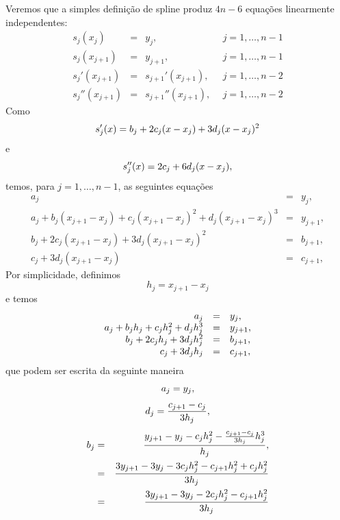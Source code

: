 \documentclass[main.tex]{subfiles}
\begin{document}
Veremos que a simples definição de spline produz $4n-6$ equações linearmente independentes:
\begin{equation*}
\begin{array}{rcll}
s_j(x_j)&=&y_j,~~ &j=1,\ldots, n-1\\
s_{j}(x_{j+1})&=&y_{j+1},~~ &j=1,\ldots, n-1\\
s_{j}'(x_{j+1})&=&s_{j+1}'(x_{j+1}),~~ &j=1,\ldots, n-2\\
s_{j}''(x_{j+1})&=&s_{j+1}''(x_{j+1}),~~ &j=1,\ldots, n-2
\end{array}
\end{equation*}
Como
\begin{equation}{\label{eq_1derivada}}
s'_j(x)=b_j+2c_j(x-x_j)+3d_j(x-x_j)^2
\end{equation}
e
\begin{equation}{\label{eq_2derivada}}
s''_j(x)=2c_j+6d_j(x-x_j),
\end{equation}
temos, para $j=1,\ldots, n-1$, as seguintes equações
\begin{equation*}
\begin{array}{rcl}
a_j&=&y_j,\\
a_j+b_j(x_{j+1}-x_j)+c_j(x_{j+1}-x_j)^2+d_j(x_{j+1}-x_j)^3&=&y_{j+1},\\
b_j+2c_j(x_{j+1}-x_j)+3d_j(x_{j+1}-x_j)^2&=&b_{j+1},\\
c_j+3d_j(x_{j+1}-x_j)&=&c_{j+1},
\end{array}
\end{equation*}
Por simplicidade, definimos
$$
h_j=x_{j+1}-x_j
$$
e temos
\begin{equation}
\begin{array}{rcl}
a_j&=&y_j,\\
a_j+b_jh_j+c_jh_j^2+d_jh_j^3&=&y_{j+1},\\
{\label{eq3}}b_j+2c_jh_j+3d_jh_j^2&=&b_{j+1},\\
\nonumber c_j+3d_jh_j&=&c_{j+1},
\end{array}
\end{equation}
que podem ser escrita da seguinte maneira
\begin{equation}{\label{eq_an_spline}}
a_j=y_j,
\end{equation}
\begin{equation}{\label{eq_dn_spline}}
d_j=\frac{c_{j+1}-c_j}{3h_j},
\end{equation}
\begin{eqnarray}
\nonumber b_j&=&\frac{y_{j+1}-y_j-c_jh_j^2-\frac{c_{j+1}-c_j}{3h_j}h_j^3}{h_j},\\
\nonumber &=&\frac{3y_{j+1}-3y_j-3c_jh_j^2-c_{j+1}h_j^2+c_jh_j^2}{3h_j}\\
{\label{eq_bn_spline}}&=&\frac{3y_{j+1}-3y_j-2c_jh_j^2-c_{j+1}h_j^2}{3h_j}
\end{eqnarray}
\end{document}
